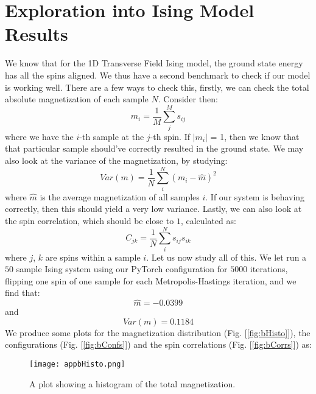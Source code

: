 \documentclass[12pt]{article}
\begin{document}
{\section{Exploration into Ising Model Results} \label{appendixb}
We know that for the 1D Transverse Field Ising model, the ground state energy has all the spins aligned. We thus have a second benchmark to check if our model is working well. \newline
There are a few ways to check this, firstly, we can check the total absolute magnetization of each sample $N$. Consider then:
\begin{equation*}
    m_i = \frac{1}{M} \sum_j^M s_{ij}
\end{equation*}
where we have the $i$-th sample at the $j$-th spin. If $|m_i|$ = 1, then we know that that particular sample should've correctly resulted in the ground state.
\newline
We may also look at the variance of the magnetization, by studying:
\begin{equation*}
    Var(m) = \frac{1}{N} \sum_i^N (m_i - \hat m )^2
\end{equation*}
where $\hat m$ is the average magnetization of all samples $i$. If our system is behaving correctly, then this should yield a very low variance.
\newline
Lastly, we can also look at the spin correlation, which should be close to $1$, calculated as:
\begin{equation*}
    C_{jk} = \frac{1}{N} \sum_{i}^N s_{ij} s_{ik}
\end{equation*}
where $j$, $k$ are spins within a sample $i$.
\newline
Let us now study all of this. We let run a $50$ sample Ising system using our PyTorch configuration for $5000$ iterations, flipping one spin of one sample for each Metropolis-Hastings iteration, and we find that:
\begin{equation*}
    \hat m = -0.0399
\end{equation*}
and
\begin{equation*}
    Var(m) = 0.1184
\end{equation*}
We produce some plots for the magnetization distribution (Fig. [\ref{fig:bHisto}]), the configurations (Fig. [\ref{fig:bConfs}]) and the spin correlations (Fig. [\ref{fig:bCorrs}]) as:
\begin{figure}[ht!]
    \centering
    \texttt{[image: appbHisto.png]}
    \caption{A plot showing a histogram of the total magnetization. \newline
}
\end{figure}}
\end{document}
